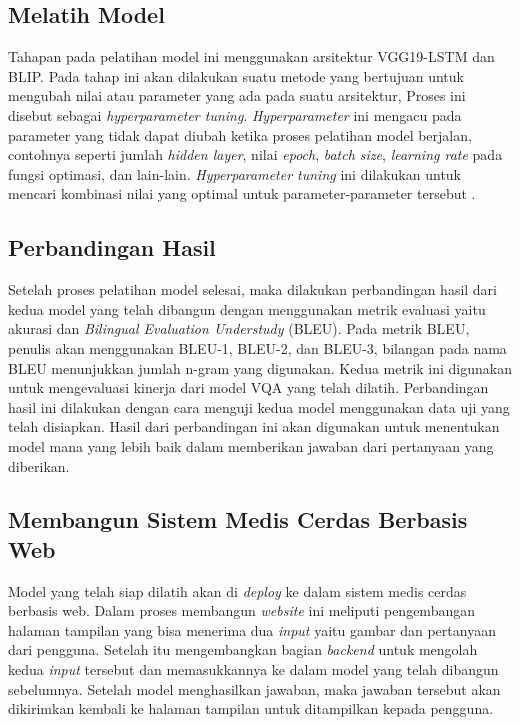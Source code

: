 \subsection{Melatih Model}

\par Tahapan pada pelatihan model ini menggunakan arsitektur VGG19-LSTM dan BLIP. Pada tahap ini akan dilakukan suatu metode yang bertujuan untuk mengubah nilai atau parameter yang ada pada suatu arsitektur, Proses ini disebut sebagai \textit{hyperparameter tuning}. \textit{Hyperparameter} ini mengacu pada parameter yang tidak dapat diubah ketika proses pelatihan model berjalan, contohnya seperti jumlah \textit{hidden layer}, nilai \textit{epoch}, \textit{batch size}, \textit{learning rate} pada fungsi optimasi, dan lain-lain. \textit{Hyperparameter tuning} ini dilakukan untuk mencari kombinasi nilai yang optimal untuk parameter-parameter tersebut \citep{yu2020hyper}.

\subsection{Perbandingan Hasil}

\par Setelah proses pelatihan model selesai, maka dilakukan perbandingan hasil dari kedua model yang telah dibangun dengan menggunakan metrik evaluasi yaitu akurasi dan \textit{Bilingual Evaluation Understudy} (BLEU). Pada metrik BLEU, penulis akan menggunakan BLEU-1, BLEU-2, dan BLEU-3, bilangan pada nama BLEU menunjukkan jumlah n-gram yang digunakan. Kedua metrik ini digunakan untuk mengevaluasi kinerja dari model VQA yang telah dilatih. Perbandingan hasil ini dilakukan dengan cara menguji kedua model menggunakan data uji yang telah disiapkan. Hasil dari perbandingan ini akan digunakan untuk menentukan model mana yang lebih baik dalam memberikan jawaban dari pertanyaan yang diberikan. 




\subsection{Membangun Sistem Medis Cerdas Berbasis Web}

\par Model yang telah siap dilatih akan di \textit{deploy} ke dalam sistem medis cerdas berbasis web. Dalam proses membangun \textit{website} ini meliputi pengembangan halaman tampilan yang bisa menerima dua \textit{input} yaitu gambar dan pertanyaan dari pengguna. Setelah itu mengembangkan bagian \textit{backend} untuk mengolah kedua \textit{input} tersebut dan memasukkannya ke dalam model yang telah dibangun sebelumnya. Setelah model menghasilkan jawaban, maka jawaban tersebut akan dikirimkan kembali ke halaman tampilan untuk ditampilkan kepada pengguna.

